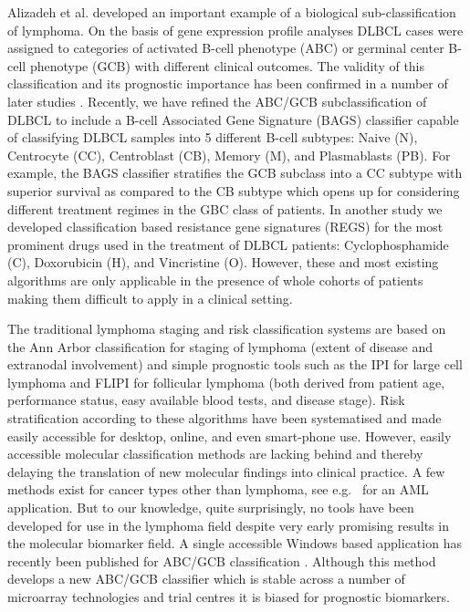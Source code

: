 \documentclass[10pt]{bmc_article}
\newenvironment{bmcformat}{\fussy\setboolean{publ}{true}}{\fussy}
\begin{document}
\begin{bmcformat}
Alizadeh et al. \cite{Alizadeh2000} developed an important example of a biological sub-classification of lymphoma. On the basis of gene expression profile analyses DLBCL cases were assigned to categories of activated B-cell phenotype (ABC) or germinal center B-cell phenotype (GCB) with different clinical outcomes. The validity of this classification and its prognostic importance has been confirmed in a number of later studies \cite{Rosenwald2002a,Hans2004,Lenz2008a,Monti2012a}. Recently, we have refined the ABC/GCB subclassification of DLBCL to include a B-cell Associated Gene Signature (BAGS) classifier capable of classifying DLBCL samples into 5 different B-cell subtypes: Naive (N), Centrocyte (CC), Centroblast (CB), Memory (M), and Plasmablasts (PB). For example, the BAGS classifier stratifies the GCB subclass into a CC subtype with superior survival as compared to the CB subtype \cite{Dybkaer2013} which opens up for considering different treatment regimes in the GBC class of patients. In another study \cite{Falgreen2013c} we developed classification based resistance gene signatures (REGS) for the most prominent drugs used in the treatment of DLBCL patients: Cyclophosphamide (C), Doxorubicin (H), and Vincristine (O). However, these and most existing algorithms are only applicable in the presence of whole cohorts of patients making them difficult to apply in a clinical setting.

The traditional lymphoma staging and risk classification systems are based on the Ann Arbor classification for staging of lymphoma (extent of disease and extranodal involvement) and simple prognostic tools such as the IPI for large cell lymphoma and FLIPI for follicular lymphoma (both derived from patient age, performance status, easy available blood tests, and disease stage). Risk stratification according to these algorithms have been systematised and made easily accessible for desktop, online, and even smart-phone use. However, easily accessible molecular classification methods are lacking behind and thereby delaying the translation of new molecular findings into clinical practice. A few methods exist for cancer types other than lymphoma, see e.g.\ \cite{Huang2009} for an AML application. But to our knowledge, quite surprisingly, no tools have been developed for use in the lymphoma field despite very early promising results in the molecular biomarker field. A single accessible Windows based application has recently been published for ABC/GCB classification \cite{Care2013}. Although this method develops a new ABC/GCB classifier which is stable across a number of microarray technologies and trial centres it is biased for prognostic biomarkers.


\end{bmcformat}
\end{document}
